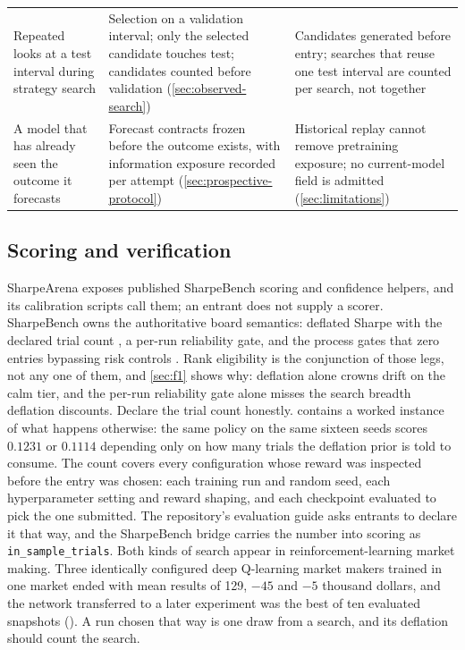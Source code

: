 \begin{table}[t]
\begin{tabular}{@{}p{3.3cm} p{4.6cm} p{5.2cm}@{}}
\addlinespace
Repeated looks at a test interval during strategy search & Selection on a validation interval; only the selected candidate touches test; candidates counted before validation (\cref{sec:observed-search}) & Candidates generated before entry; searches that reuse one test interval are counted per search, not together \\
\addlinespace
A model that has already seen the outcome it forecasts & Forecast contracts frozen before the outcome exists, with information exposure recorded per attempt (\cref{sec:prospective-protocol}) & Historical replay cannot remove pretraining exposure; no current-model field is admitted (\cref{sec:limitations}) \\
\bottomrule
\end{tabular}
\end{table}

\subsection{Scoring and verification}\label{sec:protocol-scoring}

SharpeArena exposes published SharpeBench scoring and confidence helpers, and its calibration scripts call them; an entrant does not supply a scorer. SharpeBench owns the authoritative board semantics: deflated Sharpe with the declared trial count \citep{bailey2014deflated}, a per-run reliability gate, and the process gates that zero entries bypassing risk controls \citep{toca2026sharpebench}. Rank eligibility is the conjunction of those legs, not any one of them, and \cref{sec:f1} shows why: deflation alone crowns drift on the calm tier, and the per-run reliability gate alone misses the search breadth deflation discounts. Declare the trial count honestly.  contains a worked instance of what happens otherwise: the same policy on the same sixteen seeds scores $0.1231$ or $0.1114$ depending only on how many trials the deflation prior is told to consume. The count covers every configuration whose reward was inspected before the entry was chosen: each training run and random seed, each hyperparameter setting and reward shaping, and each checkpoint evaluated to pick the one submitted. The repository's evaluation guide asks entrants to declare it that way, and the SharpeBench bridge carries the number into scoring as \texttt{in\_sample\_trials}. Both kinds of search appear in reinforcement-learning market making. Three identically configured deep Q-learning market makers trained in one market ended with mean results of 129, $-45$ and $-5$ thousand dollars, and the network transferred to a later experiment was the best of ten evaluated snapshots (\citealp[PDF pp.~52, 55--56, 58]{fernandezvicente2025market}). A run chosen that way is one draw from a search, and its deflation should count the search.

